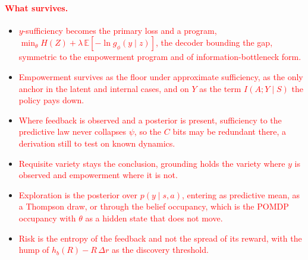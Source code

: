 \documentclass[10pt]{article}
\newcommand{\add}[1]{\textcolor{red}{#1}}
\begin{document}
\paragraph{\add{What survives.}}
\begin{itemize}
  \item \add{$y$-sufficiency becomes the primary loss and a program, $\min_\theta H(Z) + \lambda\,\mathbb E[-\ln g_\phi(y \mid z)]$, the decoder bounding the gap, symmetric to the empowerment program and of information-bottleneck form.}
  \item \add{Empowerment survives as the floor under approximate sufficiency, as the only anchor in the latent and internal cases, and on $Y$ as the term $I(A;Y \mid S)$ the policy pays down.}
  \item \add{Where feedback is observed and a posterior is present, sufficiency to the predictive law never collapses $\psi$, so the $C$ bits may be redundant there, a derivation still to test on known dynamics.}
  \item \add{Requisite variety stays the conclusion, grounding holds the variety where $y$ is observed and empowerment where it is not.}
  \item \add{Exploration is the posterior over $p(y \mid s,a)$, entering as predictive mean, as a Thompson draw, or through the belief occupancy, which is the POMDP occupancy with $\theta$ as a hidden state that does not move.}
  \item \add{Risk is the entropy of the feedback and not the spread of its reward, with the hump of $h_b(R) - R\,\Delta r$ as the discovery threshold.}
\end{itemize}
\end{document}
